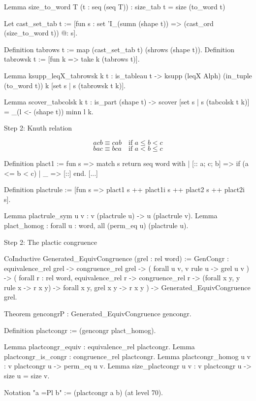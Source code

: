 \documentclass[compress,11pt]{beamer}
\begin{document}
\begin{frame}[fragile]

\begin{coqcode}
Lemma size_to_word T (t : seq (seq T)) : size_tab t = size (to_word t)

Let cast_set_tab t :=
  [fun s : {set 'I_(sumn (shape t))} => (cast_ord (size_to_word t)) @: s].

Definition tabrows t := map (cast_set_tab t) (shrows (shape t)).
Definition tabrowsk t := [fun k => take k (tabrows t)].

Lemma ksupp_leqX_tabrowsk k t : is_tableau t ->
  ksupp (leqX Alph) (in_tuple (to_word t)) k [set s | s \in (tabrowsk t k)].

Lemma scover_tabcolsk k t : is_part (shape t) ->
  scover [set s | s \in (tabcolsk t k)] = \sum_(l <- (shape t)) minn l k.
\end{coqcode}
\end{frame}

\begin{frame}[fragile]{Step 2: Knuth relation}

\[acb \equiv cab\quad \text{if $a \leq b < c$}\]
\[bac \equiv bca\quad \text{if $a < b \leq c$}\]

  \begin{coqcode}
Definition plact1 :=
  fun s => match s return seq word with
    | [:: a; c; b] => 
        if (a <= b < c)%
    | _ => [::]
  end.
[...]

Definition plactrule := 
  [fun s => plact1 s ++ plact1i s ++ plact2 s ++ plact2i s].

Lemma plactrule_sym u v : v \in (plactrule u) -> u \in (plactrule v).
Lemma plact_homog : forall u : word, all (perm_eq u) (plactrule u).
  \end{coqcode}
\end{frame}

\begin{frame}[fragile]{Step 2: The plactic congruence}

  \begin{coqcode}
CoInductive Generated_EquivCongruence (grel : rel word) :=
  GenCongr : equivalence_rel grel ->
             congruence_rel grel ->
             ( forall u v, v \in rule u -> grel u v ) ->
             ( forall r : rel word,
                      equivalence_rel r -> congruence_rel r ->
                      (forall x y, y \in rule x -> r x y) ->
                      forall x y, grel x y -> r x y
             ) -> Generated_EquivCongruence grel.

Theorem gencongrP : Generated_EquivCongruence gencongr.

Definition plactcongr := (gencongr plact_homog).

Lemma plactcongr_equiv : equivalence_rel plactcongr.
Lemma plactcongr_is_congr : congruence_rel plactcongr.
Lemma plactcongr_homog u v : v \in plactcongr u -> perm_eq u v.
Lemma size_plactcongr u v : v \in plactcongr u -> size u = size v.

Notation "a =Pl b" := (plactcongr a b) (at level 70).
  \end{coqcode}
\end{frame}
\end{document}
